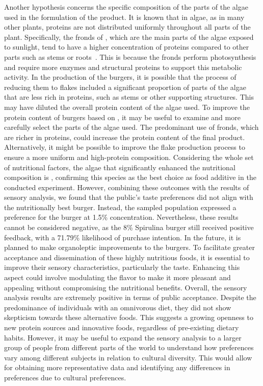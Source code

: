 Another hypothesis concerns the specific composition of the parts of the algae used in the formulation of the product. It is known that in algae, as in many other plants, proteins are not distributed uniformly throughout all parts of the plant. Specifically, the fronds of , which are the main parts of the algae exposed to sunlight, tend to have a higher concentration of proteins compared to other parts such as stems or roots~\parencite{galland-irmouli_Nutritional_1999}.
This is because the fronds perform photosynthesis and require more enzymes and structural proteins to support this metabolic activity. In the production of the burgers, it is possible that the process of reducing them to flakes included a significant proportion of parts of the algae that are less rich in proteins, such as stems or other supporting structures. This may have diluted the overall protein content of the algae used. To improve the protein content of burgers based on , it may be useful to examine and more carefully select the parts of the algae used. The predominant use of fronds, which are richer in proteins, could increase the protein content of the final product. Alternatively, it might be possible to improve the flake production process to ensure a more uniform and high-protein composition.
Considering the whole set of nutritional factors, the algae that significantly enhanced the nutritional composition is , confirming this species as the best choice as food additive in the conducted experiment.
However, combining these outcomes with the results of sensory analysis, we found that the public’s taste preferences did not align with the nutritionally best burger. Instead, the sampled population expressed a preference for the  burger at 1.5\% concentration. Nevertheless, these results cannot be considered negative, as the 8\% Spirulina burger still received positive feedback, with a 71.79\% likelihood of purchase intention.
In the future, it is planned to make organoleptic improvements to the  burgers. To facilitate greater acceptance and dissemination of these highly nutritious foods, it is essential to improve their sensory characteristics, particularly the taste. Enhancing this aspect could involve modulating the flavor to make it more pleasant and appealing without compromising the nutritional benefits.
Overall, the sensory analysis results are extremely positive in terms of public acceptance. Despite the predominance of individuals with an omnivorous diet, they did not show skepticism towards these alternative foods. This suggests a growing openness to new protein sources and innovative foods, regardless of pre-existing dietary habits. However, it may be useful to expand the sensory analysis to a larger group of people from different parts of the world to understand how preferences vary among different subjects in relation to cultural diversity. This would allow for obtaining more representative data and identifying any differences in preferences due to cultural preferences.
